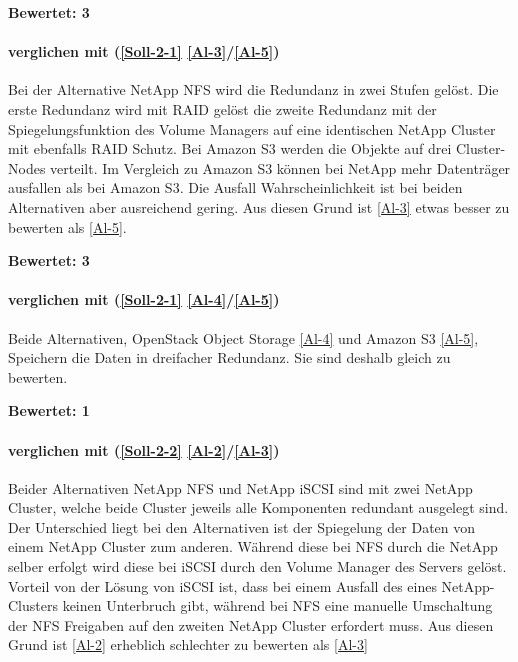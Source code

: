 \textbf{Bewertet: 3}

\paragraph*{  verglichen mit  (\ref{Soll-2-1} \ref{Al-3}/\ref{Al-5})}
Bei der Alternative NetApp NFS wird die Redundanz in zwei Stufen gelöst. Die erste Redundanz wird mit RAID gelöst die zweite Redundanz mit der Spiegelungsfunktion des Volume Managers auf eine identischen NetApp Cluster mit ebenfalls RAID Schutz. Bei Amazon S3 werden die Objekte auf drei Cluster-Nodes verteilt. Im Vergleich zu Amazon S3 können bei NetApp mehr Datenträger ausfallen als bei Amazon S3. Die Ausfall Wahrscheinlichkeit ist bei beiden Alternativen aber ausreichend gering. Aus diesen Grund ist  \ref{Al-3} etwas besser zu bewerten als  \ref{Al-5}.

\textbf{Bewertet: 3}

\paragraph*{  verglichen mit  (\ref{Soll-2-1} \ref{Al-4}/\ref{Al-5})}
Beide Alternativen, OpenStack Object Storage \ref{Al-4} und Amazon S3 \ref{Al-5}, Speichern die Daten in dreifacher Redundanz. Sie sind deshalb gleich zu bewerten.

\textbf{Bewertet: 1}




\paragraph*{  verglichen mit  (\ref{Soll-2-2} \ref{Al-2}/\ref{Al-3})}
Beider Alternativen NetApp NFS und NetApp iSCSI sind mit zwei NetApp Cluster, welche beide Cluster jeweils alle Komponenten redundant ausgelegt sind. Der Unterschied liegt bei den Alternativen ist der Spiegelung der Daten von einem NetApp Cluster zum anderen. Während diese bei NFS durch die NetApp selber erfolgt wird diese bei iSCSI durch den Volume Manager des Servers gelöst. Vorteil von der Lösung von iSCSI ist, dass bei einem Ausfall des eines NetApp-Clusters keinen Unterbruch gibt, während bei NFS eine manuelle Umschaltung der NFS Freigaben auf den zweiten NetApp Cluster erfordert muss. Aus diesen Grund ist  \ref{Al-2} erheblich schlechter zu bewerten als  \ref{Al-3}

